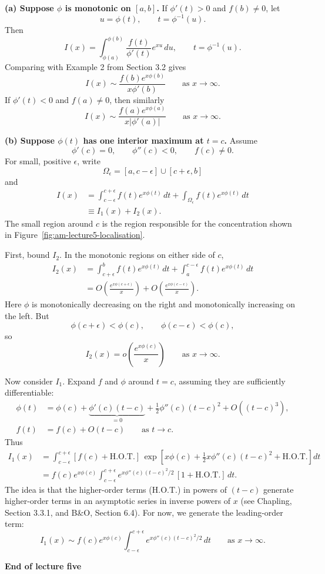 \noindent\textbf{(a) Suppose $\phi$ is monotonic on $[a,b]$.}
If $\phi'(t)>0$ and $f(b)\neq0$, let
\[
    u=\phi(t),\qquad t=\phi^{-1}(u).
\]
Then
\[
    I(x)=\int_{\phi(a)}^{\phi(b)}
    \frac{f(t)}{\phi'(t)}e^{xu}\,du,
    \qquad t=\phi^{-1}(u).
\]
Comparing with Example 2 from Section 3.2 gives
\[
    I(x)\sim\frac{f(b)e^{x\phi(b)}}{x\phi'(b)}
    \qquad\text{as }x\to\infty.
\]
If $\phi'(t)<0$ and $f(a)\neq0$, then similarly
\[
    I(x)\sim\frac{f(a)e^{x\phi(a)}}{x|\phi'(a)|}
    \qquad\text{as }x\to\infty.
\]

\noindent\textbf{(b) Suppose $\phi(t)$ has one interior maximum at $t=c$.}
Assume
\[
    \phi'(c)=0,\qquad \phi''(c)<0,\qquad f(c)\neq0.
\]
For small, positive $\epsilon$, write
\[
    \Omega_\epsilon=[a,c-\epsilon]\cup[c+\epsilon,b]
\]
and
\begin{align*}
    I(x)&=\int_{c-\epsilon}^{c+\epsilon}f(t)e^{x\phi(t)}\,dt
    +\int_{\Omega_\epsilon}f(t)e^{x\phi(t)}\,dt\\
    &\equiv I_1(x)+I_2(x).
\end{align*}
The small region around $c$ is the region responsible for the concentration
shown in Figure~\ref{fig:am-lecture5-localisation}.

First, bound $I_2$. In the monotonic regions on either side of $c$,
\begin{align*}
    I_2(x)&=\int_{c+\epsilon}^b f(t)e^{x\phi(t)}\,dt
    +\int_a^{c-\epsilon}f(t)e^{x\phi(t)}\,dt\\
    &=O\!\left(\frac{e^{x\phi(c+\epsilon)}}{x}\right)
    +O\!\left(\frac{e^{x\phi(c-\epsilon)}}{x}\right).
\end{align*}
Here $\phi$ is monotonically decreasing on the right and monotonically
increasing on the left. But
\[
    \phi(c+\epsilon)<\phi(c),\qquad
    \phi(c-\epsilon)<\phi(c),
\]
so
\[
    I_2(x)=o\!\left(\frac{e^{x\phi(c)}}{x}\right)
    \qquad\text{as }x\to\infty.
\]

Now consider $I_1$. Expand $f$ and $\phi$ around $t=c$, assuming they are
sufficiently differentiable:
\begin{align*}
    \phi(t)&=\phi(c)+\underbrace{\phi'(c)(t-c)}_{=0}
    +\tfrac12\phi''(c)(t-c)^2+O((t-c)^3),\\
    f(t)&=f(c)+O(t-c)
    \qquad\text{as }t\to c.
\end{align*}
Thus
\begin{align*}
    I_1(x)
    &=\int_{c-\epsilon}^{c+\epsilon}
    [f(c)+\text{H.O.T.}]\,
    \exp\!\left[x\phi(c)+\tfrac12x\phi''(c)(t-c)^2
    +\text{H.O.T.}\right]dt\\
    &=f(c)e^{x\phi(c)}\int_{c-\epsilon}^{c+\epsilon}
    e^{x\phi''(c)(t-c)^2/2}\,[1+\text{H.O.T.}]\,dt.
\end{align*}
The idea is that the higher-order terms (H.O.T.) in powers of $(t-c)$
generate higher-order terms in an asymptotic series in inverse powers
of $x$ (see Chapling, Section 3.3.1, and B\&O, Section 6.4).
For now, we generate the leading-order term:
\[
    I_1(x)\sim f(c)e^{x\phi(c)}
    \int_{c-\epsilon}^{c+\epsilon}e^{x\phi''(c)(t-c)^2/2}\,dt
    \qquad\text{as }x\to\infty.
\]

\begin{center}
    \textbf{End of lecture five}
\end{center}

